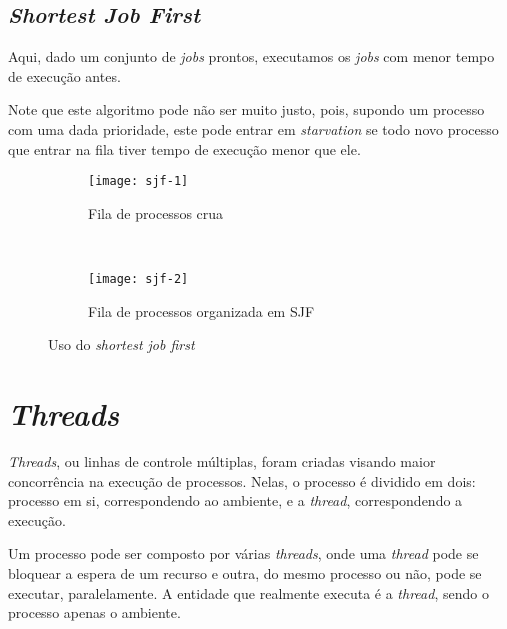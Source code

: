 \subsection{\textit{Shortest Job First}}
Aqui, dado um conjunto de \textit{jobs} prontos, executamos os \textit{jobs} com menor tempo de execução antes.

Note que este algoritmo pode não ser muito justo, pois, supondo um processo com uma dada prioridade, este pode entrar em \textit{starvation} se todo novo processo que entrar na fila tiver tempo de execução menor que ele.

\begin{figure*}[h]
  \begin{subfigure}[t]{0.45\textwidth}
    \texttt{[image: sjf-1]}
    \caption{Fila de processos crua}
    \label{fig:sjf-1}
  \end{subfigure}
  ~
  \begin{subfigure}[t]{0.45\textwidth}
    \texttt{[image: sjf-2]}
    \caption{Fila de processos organizada em SJF}
    \label{fig:sjf-2}
  \end{subfigure}

  \caption{Uso do \textit{shortest job first}}
  \label{fig:sjf}
\end{figure*}





















\section{\textit{Threads}}
\textit{Threads}, ou linhas de controle múltiplas, foram criadas visando maior concorrência na execução de processos. Nelas, o processo é dividido em dois: processo em si, correspondendo ao ambiente, e a \textit{thread}, correspondendo a execução.

Um processo pode ser composto por várias \textit{threads}, onde uma \textit{thread} pode se bloquear a espera de um recurso e outra, do mesmo processo ou não, pode se executar, paralelamente. A entidade que realmente executa é a \textit{thread}, sendo o processo apenas o ambiente.

